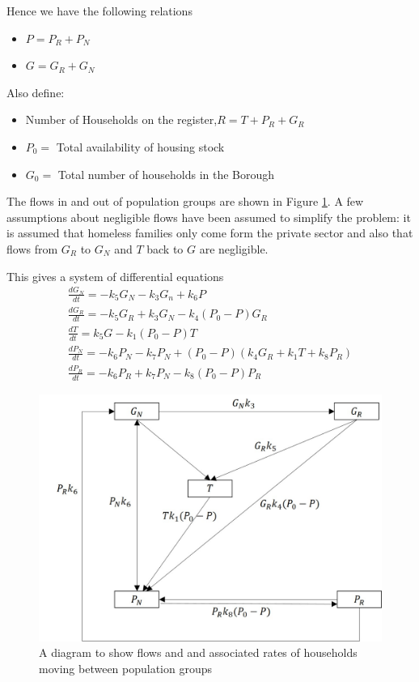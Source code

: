 \documentclass[11pt]{article} %
\begin{document}
Hence we have the following relations 
\begin{itemize}
	\item $ P=P_R+P_N $
	\item $ G=G_R+G_N $
	
\end{itemize}

Also define: 
\begin{itemize}
	\item Number of Households on the register,$  R=T+P_R+G_R $
	\item $ P_0 = $ Total availability of housing stock 
	\item $ G_0= $ Total number of households in the Borough
\end{itemize}

The flows in and out of population groups are shown in Figure \ref{fig:homelessrates}. A few assumptions about negligible flows have been assumed to simplify the problem: it is assumed that homeless families only come form the private sector and also that flows from $ G_R $ to $ G_N $ and $ T $ back to $ G $ are negligible. 

This gives a system of differential equations
\begin{eqnarray}
\frac{dG_N}{dt}=-k_5 G_N-k_3 G_n +k_6 P\\
\frac{dG_R}{dt}=-k_5 G_R +k_3 G_N -k_4 (P_0-P)G_R\\
\frac{dT}{dt}=k_5 G -k_1(P_0 -P)T\\
\frac{dP_N}{dt}=-k_6 P_N -k_7 P_N +(P_0-P)(k_4 G_R +k_1 T+k_8 P_R)\\
\frac{dP_R}{dt}=-k_6 P_R+k_7 P_N -k_8(P_0-P)P_R
\end{eqnarray}
	 \begin{figure}
	 	\centering
	 	\includegraphics[width=0.7\linewidth]{Report_images/homeless_rates}
	 	
	 	\caption{A diagram to show  flows and and associated rates of households moving  between population groups}
	 	\label{fig:homelessrates}
	 \end{figure}
	 
\end{document}
